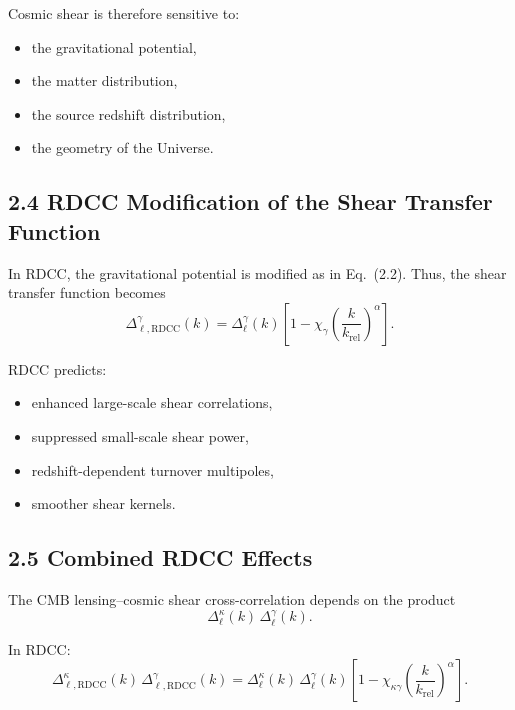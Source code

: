 \documentclass[11pt,a4paper]{article}
\begin{document}
Cosmic shear is therefore sensitive to:

\begin{itemize}
    \item the gravitational potential,
    \item the matter distribution,
    \item the source redshift distribution,
    \item the geometry of the Universe.
\end{itemize}

\subsection*{2.4 RDCC Modification of the Shear Transfer Function}

In RDCC, the gravitational potential is modified as in Eq.~(2.2). Thus, the shear transfer 
function becomes
\begin{equation}
    \Delta_{\ell,\mathrm{RDCC}}^{\gamma}(k)
    = \Delta_{\ell}^{\gamma}(k)
      \left[
        1 - \chi_{\gamma}
        \left(\frac{k}{k_{\mathrm{rel}}}\right)^{\alpha}
      \right].
\end{equation}

RDCC predicts:

\begin{itemize}
    \item enhanced large-scale shear correlations,
    \item suppressed small-scale shear power,
    \item redshift-dependent turnover multipoles,
    \item smoother shear kernels.
\end{itemize}

\subsection*{2.5 Combined RDCC Effects}

The CMB lensing--cosmic shear cross-correlation depends on the product
\begin{equation}
    \Delta_{\ell}^{\kappa}(k)\,
    \Delta_{\ell}^{\gamma}(k).
\end{equation}

In RDCC:
\begin{equation}
    \Delta_{\ell,\mathrm{RDCC}}^{\kappa}(k)\,
    \Delta_{\ell,\mathrm{RDCC}}^{\gamma}(k)
    =
    \Delta_{\ell}^{\kappa}(k)\,
    \Delta_{\ell}^{\gamma}(k)
    \left[
        1 - \chi_{\kappa\gamma}
        \left(\frac{k}{k_{\mathrm{rel}}}\right)^{\alpha}
    \right].
\end{equation}
\end{document}
